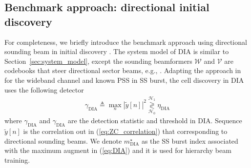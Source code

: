 \documentclass[journal]{IEEEtran}
\newtheorem{proposition}{Proposition}
\newcommand{\STO}[0]{\epsilon_{\text{T}}}
\begin{document}

% 
%
\subsection{Benchmark approach: directional initial discovery}
For completeness, we briefly introduce the benchmark approach using directional sounding beam in initial discovery \cite{7161389}. The system model of DIA is similar to Section~\ref{sec:system_model}, except the sounding beamformers $\mathcal{W}$ and $\mathcal{V}$ are codebooks that steer directional sector beams, e.g., \cite{6847111,array_textbook}. Adapting the approach in \cite{7161389} for the wideband channel and known PSS in SS burst, the cell discovery in DIA uses the following detector
\begin{align}
\gamma_{\text{DIA}} \triangleq \max_n \left|\tilde{y}[n]\right|^2 \underset{\mathcal{H}_0}{\overset{\mathcal{H}_1}{\gtrless}} \eta_{\text{DIA}}
\label{eq:DIA}
\end{align}
where $\gamma_{\text{DIA}}$ and $\gamma_{\text{DIA}}$ are the detection statistic and threshold in DIA. Sequence $\tilde{y}[n]$ is the correlation out in (\ref{eq:ZC_correlation}) that corresponding to directional sounding beams. We denote $m_{\text{DIA}}^{\star}$ as the SS burst index associated with the maximum augment in (\ref{eq:DIA}) and it is used for hierarchy beam training.
% 
%
\end{document}
